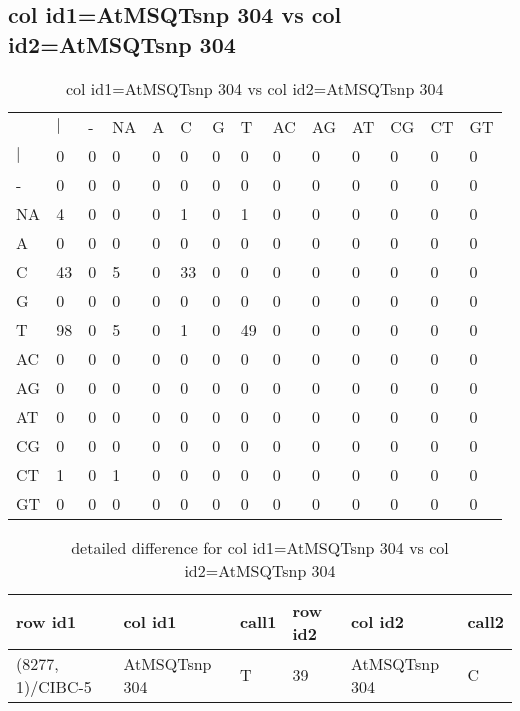 \subsection{col id1=AtMSQTsnp 304 vs col id2=AtMSQTsnp 304}
\begin{center}
\begin{longtable}{|l|l|l|l|l|l|l|l|l|l|l|l|l|l|}
\caption{col id1=AtMSQTsnp 304 vs col id2=AtMSQTsnp 304} \label{table_dm640}\\
\hline
\\
\hline
&$|$&-&NA&A&C&G&T&AC&AG&AT&CG&CT&GT\\
$|$&0&0&0&0&0&0&0&0&0&0&0&0&0\\
-&0&0&0&0&0&0&0&0&0&0&0&0&0\\
NA&4&0&0&0&1&0&1&0&0&0&0&0&0\\
A&0&0&0&0&0&0&0&0&0&0&0&0&0\\
C&43&0&5&0&33&0&0&0&0&0&0&0&0\\
G&0&0&0&0&0&0&0&0&0&0&0&0&0\\
T&98&0&5&0&1&0&49&0&0&0&0&0&0\\
AC&0&0&0&0&0&0&0&0&0&0&0&0&0\\
AG&0&0&0&0&0&0&0&0&0&0&0&0&0\\
AT&0&0&0&0&0&0&0&0&0&0&0&0&0\\
CG&0&0&0&0&0&0&0&0&0&0&0&0&0\\
CT&1&0&1&0&0&0&0&0&0&0&0&0&0\\
GT&0&0&0&0&0&0&0&0&0&0&0&0&0\\
\hline
\end{longtable}
\end{center}

\begin{center}
\begin{longtable}{|l|l|l|l|l|l|}
\caption{detailed difference for col id1=AtMSQTsnp 304 vs col id2=AtMSQTsnp 304} \label{table_dm641}\\
\hline
row id1&col id1&call1&row id2&col id2&call2\\
\hline
(8277, 1)/CIBC-5&AtMSQTsnp 304&T&39&AtMSQTsnp 304&C\\
\hline
\end{longtable}
\end{center}

